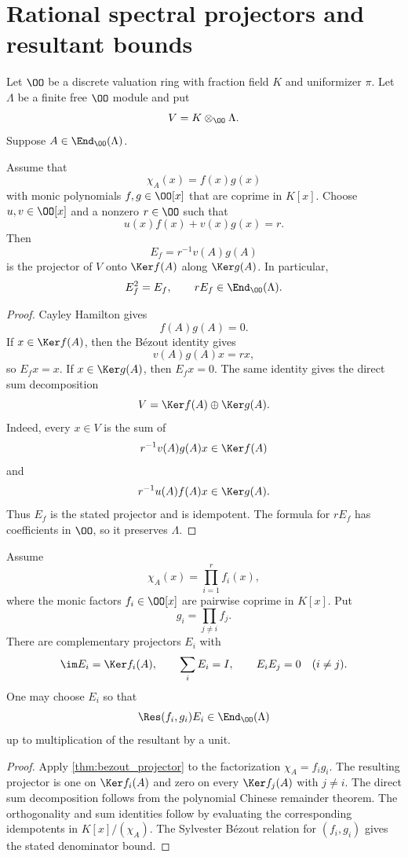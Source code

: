 \section{Rational spectral projectors and resultant bounds}\label{sec:resultant}

Let $\OO$ be a discrete valuation ring with fraction field $K$ and uniformizer $\pi$.  Let $\Lambda$ be a finite free $\OO$ module and put
\[
V=K\otimes_{\OO}\Lambda.
\]
Suppose $A\in\End_{\OO}(\Lambda)$.

\begin{theorem}\label{thm:bezout_projector}
Assume that
\[
\chi_A(x)=f(x)g(x)
\]
with monic polynomials $f,g\in\OO[x]$ that are coprime in $K[x]$.  Choose $u,v\in\OO[x]$ and a nonzero $r\in\OO$ such that
\[
u(x)f(x)+v(x)g(x)=r.
\]
Then
\[
E_f=r^{-1}v(A)g(A)
\]
is the projector of $V$ onto $\Ker f(A)$ along $\Ker g(A)$.  In particular,
\[
E_f^2=E_f,
\qquad
rE_f\in\End_{\OO}(\Lambda).
\]
\end{theorem}

\begin{proof}
Cayley Hamilton gives
\[
f(A)g(A)=0.
\]
If $x\in\Ker f(A)$, then the Bézout identity gives
\[
v(A)g(A)x=rx,
\]
so $E_fx=x$.  If $x\in\Ker g(A)$, then $E_fx=0$.  The same identity gives the direct sum decomposition
\[
V=\Ker f(A)\oplus\Ker g(A).
\]
Indeed, every $x\in V$ is the sum of
\[
r^{-1}v(A)g(A)x\in\Ker f(A)
\]
and
\[
r^{-1}u(A)f(A)x\in\Ker g(A).
\]
Thus $E_f$ is the stated projector and is idempotent.  The formula for $rE_f$ has coefficients in $\OO$, so it preserves $\Lambda$.
\end{proof}

\begin{theorem}\label{thm:several_projectors}
Assume
\[
\chi_A(x)=\prod_{i=1}^rf_i(x),
\]
where the monic factors $f_i\in\OO[x]$ are pairwise coprime in $K[x]$.  Put
\[
g_i=\prod_{j\ne i}f_j.
\]
There are complementary projectors $E_i$ with
\[
\im E_i=\Ker f_i(A),
\qquad
\sum_iE_i=I,
\qquad
E_iE_j=0
\quad(i\ne j).
\]
One may choose $E_i$ so that
\[
\Res(f_i,g_i)E_i\in\End_{\OO}(\Lambda)
\]
up to multiplication of the resultant by a unit.
\end{theorem}

\begin{proof}
Apply \cref{thm:bezout_projector} to the factorization $\chi_A=f_ig_i$.  The resulting projector is one on $\Ker f_i(A)$ and zero on every $\Ker f_j(A)$ with $j\ne i$.  The direct sum decomposition follows from the polynomial Chinese remainder theorem.  The orthogonality and sum identities follow by evaluating the corresponding idempotents in $K[x]/(\chi_A)$.  The Sylvester Bézout relation for $(f_i,g_i)$ gives the stated denominator bound.
\end{proof}

